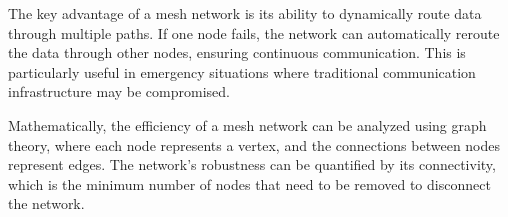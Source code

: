 The key advantage of a mesh network is its ability to dynamically route data through multiple paths. If one node fails, the network can automatically reroute the data through other nodes, ensuring continuous communication. This is particularly useful in emergency situations where traditional communication infrastructure may be compromised.

Mathematically, the efficiency of a mesh network can be analyzed using graph theory, where each node represents a vertex, and the connections between nodes represent edges. The network's robustness can be quantified by its connectivity, which is the minimum number of nodes that need to be removed to disconnect the network.

